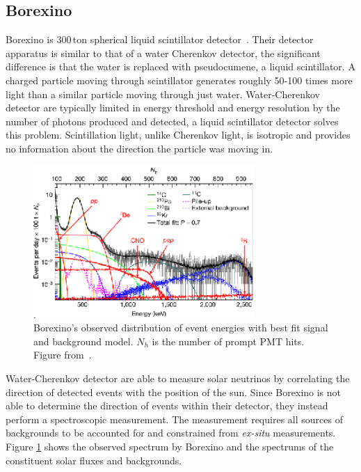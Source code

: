 \subsection{Borexino}
Borexino is 300\,ton spherical liquid scintillator detector~\cite{borexino_tdr}. Their detector
apparatus is similar to that of a water Cherenkov detector, the significant difference
is that the water is replaced with pseudocumene, a liquid scintillator.
A charged particle moving through scintillator generates roughly 50-100 times
more light than a similar particle moving through just water.
Water-Cherenkov detector are typically limited in energy threshold
and energy resolution by the number of photons produced and detected, a liquid scintillator
detector solves this problem.  Scintillation light, unlike Cherenkov light,
is isotropic and provides no information about the direction the particle
was moving in.
\begin{figure}[htbp]
    \centering
    \includegraphics[width=0.75\textwidth]{borexino_spectrum}
    \caption[Borexino Spectrum] {Borexino's observed distribution of event energies with best fit
    signal and background model.
    $N_{h}$ is the number of prompt PMT hits.  Figure from~\cite{borexino_nature}.} %
\label{fig:borexino_spectrum}
\end{figure}

Water-Cherenkov detector are able to measure solar neutrinos by correlating the
direction of detected events with the position of the sun. Since Borexino is not
able to determine the direction of events within their detector, they instead
perform a spectroscopic measurement. The measurement requires
all sources of backgrounds to be accounted for and constrained from \textit{ex-situ}
measurements. Figure \ref{fig:borexino_spectrum} shows the observed spectrum by Borexino and the
spectrums of the constituent solar fluxes and backgrounds.

